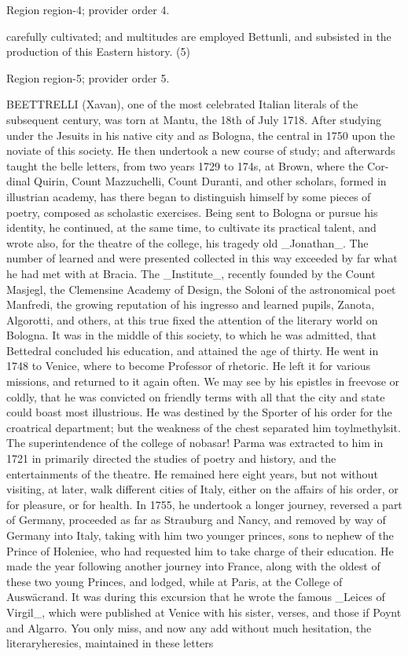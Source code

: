\documentclass[11pt]{article}
\begin{document}
{\scriptsize\color{gray} Region region-4; provider order 4.\par}
\medskip

carefully cultivated; and multitudes are employed Bettunli, and subsisted in the production of this Eastern history. (5)
\par

{\scriptsize\color{gray} Region region-5; provider order 5.\par}
\medskip

BEETTRELLI (Xavan), one of the most celebrated Italian literals of the subsequent century, was torn at Mantu, the 18th of July 1718. After studying under the Jesuits in his native city and as Bologna, the central in 1750 upon the noviate of this society. He then undertook a new course of study; and afterwards taught the belle letters, from two years 1729 to 174s, at Brown, where the Cor- dinal Quirin, Count Mazzuchelli, Count Duranti, and other scholars, formed in illustrian academy, has there began to distinguish himself by some pieces of poetry, composed as scholastic exercises. Being sent to Bologna or pursue his identity, he continued, at the same time, to cultivate its practical talent, and wrote also, for the theatre of the college, his tragedy old \_Jonathan\_. The number of learned and were presented collected in this way exceeded by far what he had met with at Bracia. The \_Institute\_, recently founded by the Count Masjegl, the Clemensine Academy of Design, the Soloni of the astronomical poet Manfredi, the growing reputation of his ingresso and learned pupils, Zanota, Algorotti, and others, at this true fixed the attention of the literary world on Bologna. It was in the middle of this society, to which he was admitted, that Bettedral concluded his education, and attained the age of thirty. He went in 1748 to Venice, where to become Professor of rhetoric. He left it for various missions, and returned to it again often. We may see by his epistles in freevose or coldly, that he was convicted on friendly terms with all that the city and state could boast most illustrious. He was destined by the Sporter of his order for the croatrical department; but the weakness of the chest separated him toylmethylsit. The superintendence of the college of nobasar! Parma was extracted to him in 1721 in primarily directed the studies of poetry and history, and the entertainments of the theatre. He remained here eight years, but not without visiting, at later, walk different cities of Italy, either on the affairs of his order, or for pleasure, or for health. In 1755, he undertook a longer journey, reversed a part of Germany, proceeded as far as Strauburg and Nancy, and removed by way of Germany into Italy, taking with him two younger princes, sons to nephew of the Prince of Holeniee, who had requested him to take charge of their education. He made the year following another journey into France, along with the oldest of these two young Princes, and lodged, while at Paris, at the College of Auswäcrand. It was during this excursion that he wrote the famous \_Leices of Virgil\_, which were published at Venice with his sister, verses, and those if Poynt and Algarro. You only miss, and now any add without much hesitation, the literaryheresies, maintained in these letters 
\end{document}
